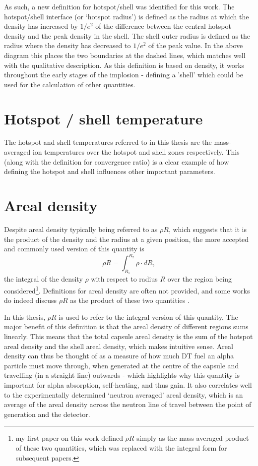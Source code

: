As such, a new definition for hotspot/shell was identified for this work. The hotspot/shell interface (or `hotspot radius') is defined as the radius at which the density has increased by $1/e^2$ of the difference between the central hotspot density and the peak density in the shell. The shell outer radius is defined as the radius where the density has decreased to $1/e^2$ of the peak value. In the above diagram this places the two boundaries at the dashed lines, which matches well with the qualitative description. As this definition is based on density, it works throughout the early stages of the implosion - defining a 'shell' which could be used for the calculation of other quantities. 

\section{Hotspot / shell temperature}
The hotspot and shell temperatures referred to in this thesis are the mass-averaged ion temperatures over the hotspot and shell zones respectively. This (along with the definition for convergence ratio) is a clear example of how defining the hotspot and shell influences other important parameters.

\section{Areal density}

Despite areal density typically being referred to as $\rho R$, which suggests that it is the product of the density and the radius at a given position, the more accepted and commonly used version \cite{Craxton2005, Betti2005, Abu-Shawareb2022} of this quantity is \begin{equation} \rho R = \int_{R_1}^{R_2} \rho \cdot dR, \end{equation} the integral of the density $\rho$ with respect to radius $R$ over the region being considered\footnote{my first paper on this work defined $\rho R$ simply as the mass averaged product of these two quantities, which was replaced with the integral form for subsequent papers.}. Definitions for areal density are often not provided, and some works do indeed discuss $\rho R$ as the product of these two quantities \cite{Atzeni2008}.

In this thesis, $\rho R$ is used to refer to the integral version of this quantity. The major benefit of this definition is that the areal density of different regions sums linearly. This means that the total capsule areal density is the sum of the hotspot areal density and the shell areal density, which makes intuitive sense. Areal density can thus be thought of as a measure of how much DT fuel an alpha particle must move through, when generated at the centre of the capsule and travelling (in a straight line) outwards - which highlights why this quantity is important for alpha absorption, self-heating, and thus gain. It also correlates well to the experimentally determined `neutron averaged' areal density, which is an average of the areal density across the neutron line of travel between the point of generation and the detector.


